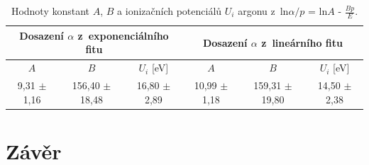 \documentclass[a4paper,12pt]{article}
\begin{document}
\begin{center}
	\begin{table}[h]
		\centering
		\caption{Hodnoty konstant $A$, $B$ a ionizačních potenciálů $U_i$ argonu z~ln$\alpha/p$ = ln$A$ - $\frac{Bp}{E}$.}
		\label{tab2}
		\begin{tabular}{|c|c|c|c|c|c|} \hline
			\multicolumn{3}{|c|}{Dosazení $\alpha$ z~exponenciálního fitu} & \multicolumn{3}{c|}{Dosazení $\alpha$ z~lineárního fitu}  \\ \hline
			$A$ & $B$ & $U_i$ [eV] & $A$ & $B$ & $U_i$ [eV] \\ \hline
			9,31 $\pm$ 1,16 & 156,40 $\pm$ 18,48 &  16,80 $\pm$ 2,89  & 10,99 $\pm$ 1,18 & 159,31 $\pm$ 19,80 & 14,50 $\pm$ 2,38\\ \hline

			
		\end{tabular}
	\end{table}
\end{center}

\newpage
\section{Závěr}
\end{document}

